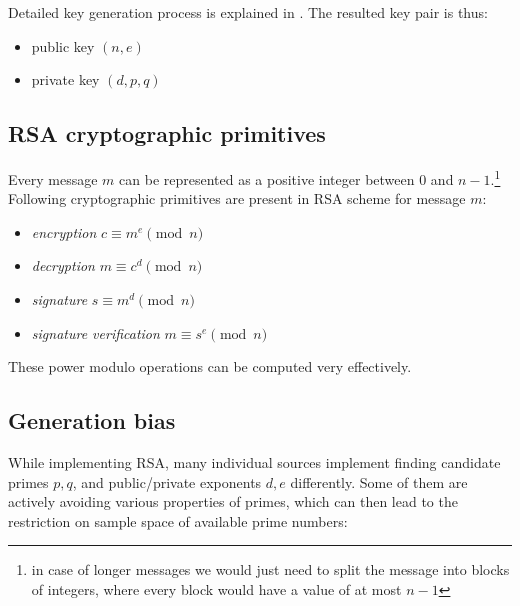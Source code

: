 Detailed key generation process is explained in \cite{thesis_matus_nemec}. The resulted key pair is thus:

\begin{itemize}

\item public key $(n, e)$

\item private key $(d, p, q)$

\end{itemize}

\subsection*{RSA cryptographic primitives}

Every message $m$ can be represented as a positive integer between 0 and $n-1$.\footnote{in case of longer messages we would just need to split the message into blocks of integers, where every block would have a value of at most $n-1$} Following cryptographic primitives are present in RSA scheme for message $m$:

\begin{itemize}

\item \textit{encryption} $c \equiv m^e \pmod{n}$
\item \textit{decryption} $m \equiv c^d \pmod{n}$
\item \textit{signature} $s \equiv m^d \pmod{n}$
\item \textit{signature verification} $m \equiv s^e \pmod{n}$

\end{itemize}

\noindent
These power modulo operations can be computed very effectively.

\subsection{Generation bias}

While implementing RSA, many individual sources implement finding candidate primes $p,q$, and public/private exponents $d,e$ differently. Some of them are actively avoiding various properties of primes, which can then lead to the restriction on sample space of available prime numbers:

